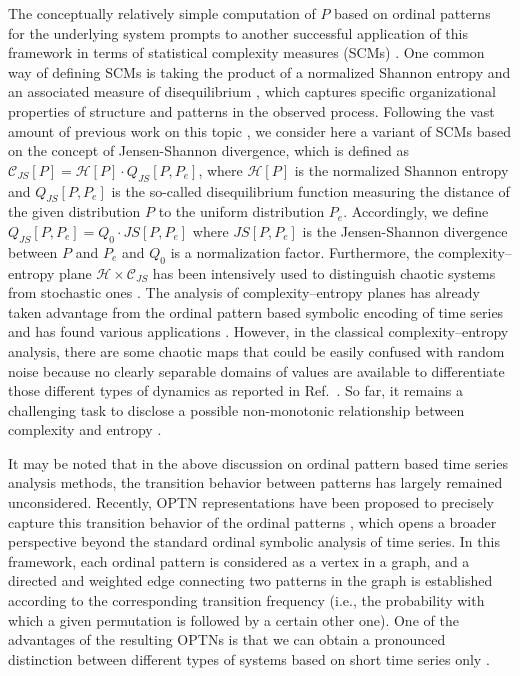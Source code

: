 \documentclass[12pt,aip,cha,reprint,nofootinbib]{revtex4-1}
\begin{document}
The conceptually relatively simple computation of $P$ based on ordinal patterns for the underlying system prompts to another successful application of this framework in terms of statistical complexity measures (SCMs) \cite{kowalskiEntropy2011}. One common way of defining SCMs is taking the product of a normalized Shannon entropy and an associated measure of disequilibrium \cite{LopezPLA1995,kowalskiEntropy2011}, which captures specific organizational properties of structure and patterns in the observed process. Following the vast amount of previous work on this topic  \cite{rossoPRL2007,LopezPLA1995,kowalskiEntropy2011,Lange2013}, we consider here a variant of SCMs based on the concept of Jensen-Shannon divergence, which is defined as $\mathcal{C}_{JS}[P] = \mathcal{H}[P] \cdot  Q_{JS}[P, P_e]$, where $\mathcal{H}[P]$ is the normalized Shannon entropy and $Q_{JS}[P, P_e]$ is the so-called disequilibrium function measuring the distance of the given distribution $P$ to the uniform distribution $P_e$. Accordingly, we define $Q_{JS}[P, P_e] = Q_{0} \cdot JS[P, P_e]$ where $JS[P, P_e]$ is the Jensen-Shannon divergence between $P$ and $P_e$ and $Q_{0}$ is a normalization factor. Furthermore, the complexity--entropy plane $\mathcal{H} \times \mathcal{C}_{JS}$ has been intensively used to distinguish chaotic systems from stochastic ones \cite{rossoPRL2007}. The analysis of complexity--entropy planes has already taken advantage from the ordinal pattern based symbolic encoding of time series and has found various applications \cite{rossoPRL2007,kowalskiEntropy2011}. However, in the classical complexity--entropy analysis, there are some chaotic maps that could be easily confused with random noise because no clearly separable domains of values are available to differentiate those different types of dynamics as reported in Ref.~\cite{BorgesAMC2019}. So far, it remains a challenging task to disclose a possible non-monotonic relationship between complexity and entropy \cite{MartinPLA2003}. 

It may be noted that in the above discussion on ordinal pattern based time series analysis methods, the transition behavior between patterns has largely remained unconsidered. Recently, OPTN representations have been proposed to precisely capture this transition behavior of the ordinal patterns \cite{MichaelChaos2015,KulpChaos2016,zhangSciRep2017,McCullough2017b,BorgesAMC2019}, which opens a broader perspective beyond the standard ordinal symbolic analysis of time series. In this framework, each ordinal pattern is considered as a vertex in a graph, and a directed and weighted edge connecting two patterns in the graph is established according to the corresponding transition frequency (i.e., the probability with which a given permutation is followed by a certain other one). One of the advantages of the resulting OPTNs is that we can obtain a pronounced distinction between different types of systems based on short time series only \cite{MichaelChaos2015,BorgesAMC2019}. 
\end{document}
